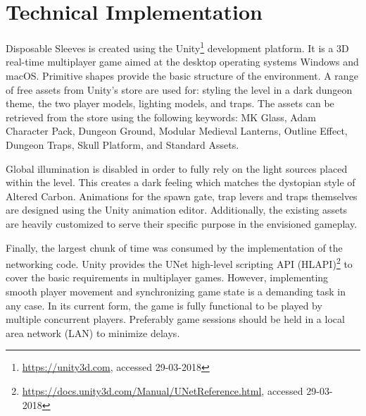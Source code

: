 \section{Technical Implementation} \label{sec:implementation}

Disposable Sleeves is created using the Unity\footnote{\url{https://unity3d.com}, accessed 29-03-2018} development platform.
It is a 3D real-time multiplayer game aimed at the desktop operating systems Windows and macOS.
Primitive shapes provide the basic structure of the environment.
A range of free assets from Unity's store are used for: styling the level in a dark dungeon theme, the two player models, lighting models, and traps.
The assets can be retrieved from the store using the following keywords: MK Glass, Adam Character Pack, Dungeon Ground, Modular Medieval Lanterns, Outline Effect, Dungeon Traps, Skull Platform, and Standard Assets.

Global illumination is disabled in order to fully rely on the light sources placed within the level.
This creates a dark feeling which matches the dystopian style of Altered Carbon.
Animations for the spawn gate, trap levers and traps themselves are designed using the Unity animation editor.
Additionally, the existing assets are heavily customized to serve their specific purpose in the envisioned gameplay.

Finally, the largest chunk of time was consumed by the implementation of the networking code.
Unity provides the UNet high-level scripting API (HLAPI)\footnote{\url{https://docs.unity3d.com/Manual/UNetReference.html}, accessed 29-03-2018} to cover the basic requirements in multiplayer games.
However, implementing smooth player movement and synchronizing game state is a demanding task in any case.
In its current form, the game is fully functional to be played by multiple concurrent players.
Preferably game sessions should be held in a local area network (LAN) to minimize delays.
